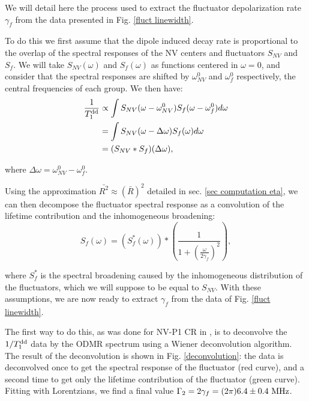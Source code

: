 \documentclass[a4paper, 11pt]{report}
\begin{document}
We will detail here the process used to extract the fluctuator depolarization rate $\gamma_f$ from the data presented in Fig. \ref{fluct linewidth}.

To do this we first assume that the dipole induced decay rate is proportional to the overlap of the spectral responses of the NV centers and fluctuators $S_{NV}$ and $S_f$. We will take $S_{NV}( \omega)$ and $S_{f}( \omega)$ as functions centered in $\omega=0$, and consider that the spectral responses are shifted by $\omega^0_{NV}$ and $\omega^0_{f}$ respectively, the central frequencies of each group. We then have:
\begin{align*}
\frac{1}{T_1^{\rm dd}} &\propto \int S_{NV} (\omega-\omega_{NV}^0) S_f (\omega-\omega_{f}^0) d\omega \\
&= \int S_{NV} (\omega-\Delta \omega) S_f (\omega)
 d\omega \\
 &= (S_{NV}*S_{f})(\Delta \omega),
\end{align*}

where $\Delta \omega=\omega_{NV}^0-\omega_{f}^0$.

Using the approximation $\bar {R ^2} \approx (\bar{R})^2$ detailed in sec. \ref{sec computation eta}, we can then decompose the fluctuator spectral response as a convolution of the lifetime contribution and the inhomogeneous broadening:
\begin{equation}
S_{f}(\omega)=\left(S_f^*(\omega)\right)*\left(\frac{1}{1+\left(\frac{\omega}{2 \gamma_f}\right)^2} \right),
\end{equation}

where $S_f^*$ is the spectral broadening caused by the inhomogeneous distribution of the fluctuators, which we will suppose to be equal to $S_{NV}$. With these assumptions, we are now ready to extract $\gamma_f$ from the data of Fig. \ref{fluct linewidth}.

The first way to do this, as was done for NV-P1 CR in \citep{hall2016detection}, is to deconvolve the $1/T_1^{\rm dd}$ data by the ODMR spectrum using a Wiener deconvolution algorithm. The result of the deconvolution is shown in Fig. \ref{deconvolution}: the data is deconvolved once to get the spectral response of the fluctuator (red curve), and a second time to get only the lifetime contribution of the fluctuator (green curve). Fitting with Lorentzians, we find a final value $\Gamma_2 =2\gamma_f= (2\pi) 6.4 \pm 0.4\ \rm MHz$.
\end{document}
